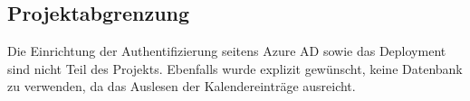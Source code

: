 \subsection{Projektabgrenzung} 
\label{sec:Projektabgrenzung}
Die Einrichtung der Authentifizierung seitens Azure AD sowie das Deployment sind nicht Teil des Projekts.
Ebenfalls wurde explizit gewünscht, keine Datenbank zu verwenden, da das Auslesen der Kalendereinträge ausreicht.

